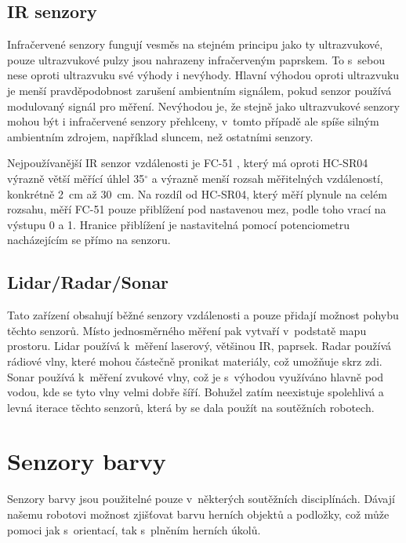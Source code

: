 \subsection{IR senzory}
Infračervené senzory fungují vesměs na stejném principu jako ty ultrazvukové, pouze ultrazvukové pulzy jsou nahrazeny infračerveným paprskem.
To s~sebou nese oproti ultrazvuku své výhody i nevýhody.
Hlavní výhodou oproti ultrazvuku je menší pravděpodobnost zarušení ambientním signálem, pokud senzor používá modulovaný signál pro měření. 
Nevýhodou je, že stejně jako ultrazvukové senzory mohou být i infračervené senzory přehlceny, v~tomto případě ale spíše silným ambientním zdrojem, například sluncem, než ostatními senzory.

Nejpoužívanější IR senzor vzdálenosti je FC-51 \cite{fc-51}, který má oproti HC-SR04 výrazně větší měřící úhlel 35$^{\circ}$ a výrazně menší rozsah měřitelných vzdáleností, konkrétně 2~cm až 30~cm.
Na rozdíl od HC-SR04, který měří plynule na celém rozsahu, měří FC-51 pouze přiblížení pod nastavenou mez, podle toho vrací na výstupu 0 a 1.
Hranice přiblížení je nastavitelná pomocí potenciometru nacházejícím se přímo na senzoru.


\subsection{Lidar/Radar/Sonar}
Tato zařízení obsahují běžné senzory vzdálenosti a pouze přidají možnost pohybu těchto senzorů. 
Místo jednosměrného měření pak vytvaří v~podstatě mapu prostoru.
Lidar používá k~měření laserový, většinou IR, paprsek.
Radar používá rádiové vlny, které mohou částečně pronikat materiály, což umožňuje  skrz zdi.
Sonar používá k~měření zvukové vlny, což je s~výhodou využíváno hlavně pod vodou, kde se tyto vlny velmi dobře šíří.
Bohužel zatím neexistuje spolehlivá a levná iterace těchto senzorů, která by se dala použít na soutěžních robotech.

\section{Senzory barvy}
Senzory barvy jsou použitelné pouze v~některých soutěžních disciplínách.
Dávají našemu robotovi možnost zjišťovat barvu herních objektů a podložky, což může pomoci jak s~orientací, tak s~plněním herních úkolů.

